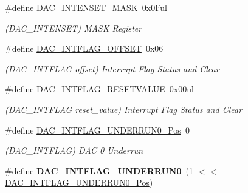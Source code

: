 \begin{DoxyCompactItemize}
\item 
\hypertarget{group___s_a_m_l21___d_a_c_ga16937f1a74d06e17331ee7d86534570a}{}\#define \hyperlink{group___s_a_m_l21___d_a_c_ga16937f1a74d06e17331ee7d86534570a}{D\+A\+C\+\_\+\+I\+N\+T\+E\+N\+S\+E\+T\+\_\+\+M\+A\+S\+K}~0x0\+Ful\label{group___s_a_m_l21___d_a_c_ga16937f1a74d06e17331ee7d86534570a}

\begin{DoxyCompactList}\small\item\em (D\+A\+C\+\_\+\+I\+N\+T\+E\+N\+S\+E\+T) M\+A\+S\+K Register \end{DoxyCompactList}\item 
\hypertarget{group___s_a_m_l21___d_a_c_gadb76074cbcb6b6dbbe088030f72d5a4b}{}\#define \hyperlink{group___s_a_m_l21___d_a_c_gadb76074cbcb6b6dbbe088030f72d5a4b}{D\+A\+C\+\_\+\+I\+N\+T\+F\+L\+A\+G\+\_\+\+O\+F\+F\+S\+E\+T}~0x06\label{group___s_a_m_l21___d_a_c_gadb76074cbcb6b6dbbe088030f72d5a4b}

\begin{DoxyCompactList}\small\item\em (D\+A\+C\+\_\+\+I\+N\+T\+F\+L\+A\+G offset) Interrupt Flag Status and Clear \end{DoxyCompactList}\item 
\hypertarget{group___s_a_m_l21___d_a_c_ga9f73e182aae9decbe33d83db01b2830b}{}\#define \hyperlink{group___s_a_m_l21___d_a_c_ga9f73e182aae9decbe33d83db01b2830b}{D\+A\+C\+\_\+\+I\+N\+T\+F\+L\+A\+G\+\_\+\+R\+E\+S\+E\+T\+V\+A\+L\+U\+E}~0x00ul\label{group___s_a_m_l21___d_a_c_ga9f73e182aae9decbe33d83db01b2830b}

\begin{DoxyCompactList}\small\item\em (D\+A\+C\+\_\+\+I\+N\+T\+F\+L\+A\+G reset\+\_\+value) Interrupt Flag Status and Clear \end{DoxyCompactList}\item 
\hypertarget{group___s_a_m_l21___d_a_c_ga99534e1a9968859517da0d7890ceedf1}{}\#define \hyperlink{group___s_a_m_l21___d_a_c_ga99534e1a9968859517da0d7890ceedf1}{D\+A\+C\+\_\+\+I\+N\+T\+F\+L\+A\+G\+\_\+\+U\+N\+D\+E\+R\+R\+U\+N0\+\_\+\+Pos}~0\label{group___s_a_m_l21___d_a_c_ga99534e1a9968859517da0d7890ceedf1}

\begin{DoxyCompactList}\small\item\em (D\+A\+C\+\_\+\+I\+N\+T\+F\+L\+A\+G) D\+A\+C 0 Underrun \end{DoxyCompactList}\item 
\hypertarget{group___s_a_m_l21___d_a_c_gab0f1209d81d340c6dcc9d3b6dcb05882}{}\#define {\bfseries D\+A\+C\+\_\+\+I\+N\+T\+F\+L\+A\+G\+\_\+\+U\+N\+D\+E\+R\+R\+U\+N0}~(1 $<$$<$ \hyperlink{group___s_a_m_l21___d_a_c_ga99534e1a9968859517da0d7890ceedf1}{D\+A\+C\+\_\+\+I\+N\+T\+F\+L\+A\+G\+\_\+\+U\+N\+D\+E\+R\+R\+U\+N0\+\_\+\+Pos})\label{group___s_a_m_l21___d_a_c_gab0f1209d81d340c6dcc9d3b6dcb05882}


\end{DoxyCompactItemize}
